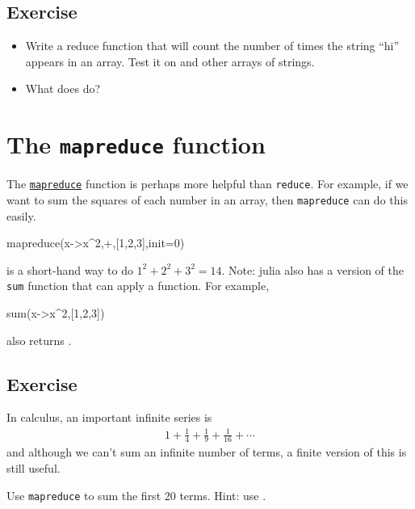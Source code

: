\subsection{Exercise}

\begin{itemize}
\item Write a reduce function that will count the number of times the string
``hi'' appears in an array. Test it on  and other arrays of strings.  

\item What does  do?
\end{itemize}

\hypertarget{the-mapreduce-function}{%
\section{\texorpdfstring{The \texttt{mapreduce}
function}{The mapreduce function}}\label{the-mapreduce-function}}

The
\href{http://docs.julialang.org/en/release-0.5/stdlib/collections/\#Base.mapreduce}{\texttt{mapreduce}} function is perhaps more helpful than \texttt{reduce}. For example, if we want to sum the squares of each number in an array, then \texttt{mapreduce} can do this easily.

\begin{jlblock}
mapreduce(x->x^2,+,[1,2,3],init=0)
\end{jlblock}
%
is a short-hand way to do $1^2+2^2+3^2=14$. Note: julia also has a version of the \texttt{sum} function that can apply a function.  For example, 
%
\begin{jlblock}[fp]
sum(x->x^2,[1,2,3])
\end{jlblock}
also returns \printpythontex[verb]. 

\subsection{Exercise}

In calculus, an important infinite series is 
%
\begin{align*}
1 + \frac{1}{4} + \frac{1}{9} + \frac{1}{16} + \cdots
\end{align*}
and although we can't sum an infinite number of terms, a finite version of this is still useful.  

Use \texttt{mapreduce} to sum the first 20 terms.  Hint: use . 


